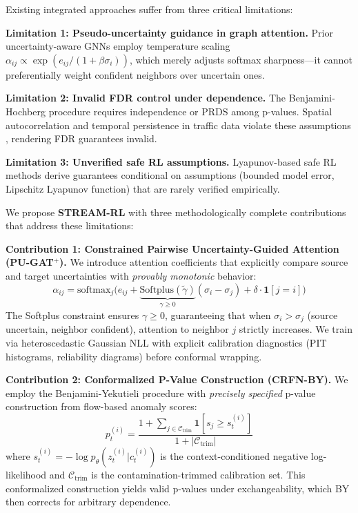 \documentclass{article}
\theoremstyle{plain}
\theoremstyle{definition}
\theoremstyle{remark}
\begin{document}
Existing integrated approaches suffer from three critical limitations:

\textbf{Limitation 1: Pseudo-uncertainty guidance in graph attention.} Prior uncertainty-aware GNNs \citep{wu2020connecting,bai2020adaptive,shang2021discrete,guo2021learning} employ temperature scaling $\alpha_{ij} \propto \exp(e_{ij}/(1 + \beta\sigma_i))$, which merely adjusts softmax sharpness---it cannot preferentially weight confident neighbors over uncertain ones.

\textbf{Limitation 2: Invalid FDR control under dependence.} The Benjamini-Hochberg procedure \citep{benjamini1995controlling} requires independence or PRDS among p-values. Spatial autocorrelation and temporal persistence in traffic data violate these assumptions \citep{fithian2022conditional,lei2018adapt}, rendering FDR guarantees invalid.

\textbf{Limitation 3: Unverified safe RL assumptions.} Lyapunov-based safe RL methods \citep{chow2018lyapunov,chow2019lyapunov,berkenkamp2017safe,fisac2019bridging} derive guarantees conditional on assumptions (bounded model error, Lipschitz Lyapunov function) that are rarely verified empirically.

We propose \textbf{STREAM-RL} with three methodologically complete contributions that address these limitations:

\textbf{Contribution 1: Constrained Pairwise Uncertainty-Guided Attention (PU-GAT$^+$).} We introduce attention coefficients that explicitly compare source and target uncertainties with \emph{provably monotonic} behavior:
\begin{equation}
\alpha_{ij} = \text{softmax}_j\Big(e_{ij} + \underbrace{\text{Softplus}(\tilde{\gamma})}_{\gamma \geq 0}(\sigma_i - \sigma_j) + \delta \cdot \mathbf{1}[j = i]\Big)
\label{eq:pugat_intro}
\end{equation}
The Softplus constraint ensures $\gamma \geq 0$, guaranteeing that when $\sigma_i > \sigma_j$ (source uncertain, neighbor confident), attention to neighbor $j$ strictly increases. We train via heteroscedastic Gaussian NLL with explicit calibration diagnostics (PIT histograms, reliability diagrams) before conformal wrapping.

\textbf{Contribution 2: Conformalized P-Value Construction (CRFN-BY).} We employ the Benjamini-Yekutieli procedure \citep{benjamini2001control} with \emph{precisely specified} p-value construction from flow-based anomaly scores:
\begin{equation}
p_t^{(i)} = \frac{1 + \sum_{j \in \mathcal{C}_{\text{trim}}} \mathbf{1}[s_j \geq s_t^{(i)}]}{1 + |\mathcal{C}_{\text{trim}}|}
\label{eq:pvalue_intro}
\end{equation}
where $s_t^{(i)} = -\log p_\theta(z_t^{(i)} | c_t^{(i)})$ is the context-conditioned negative log-likelihood and $\mathcal{C}_{\text{trim}}$ is the contamination-trimmed calibration set. This conformalized construction yields valid p-values under exchangeability, which BY then corrects for arbitrary dependence.
\end{document}
